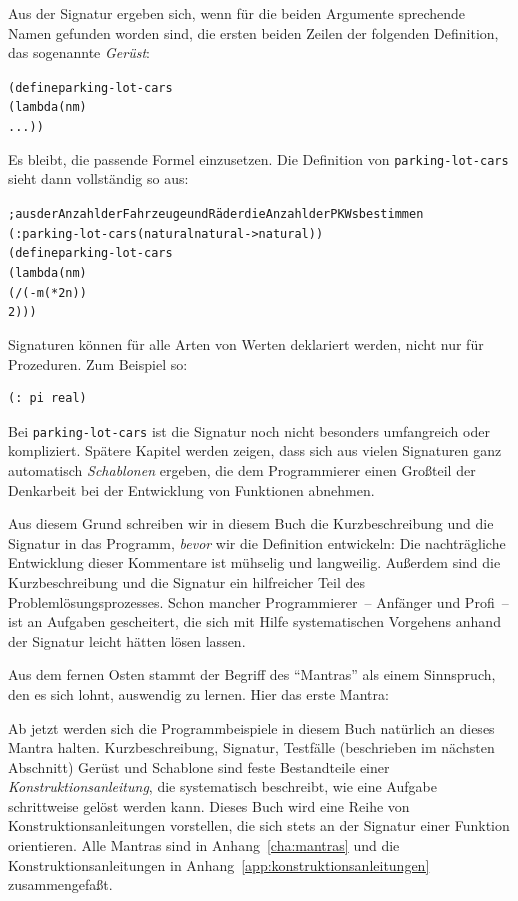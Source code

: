 Aus der Signatur ergeben sich, wenn für die beiden Argumente
sprechende Namen gefunden worden sind, die ersten beiden Zeilen der folgenden
Definition, das sogenannte \textit{Gerüst}:
%
\begin{alltt}
(define parking-lot-cars
  (lambda (n m)
    ...))
\end{alltt}
%
Es bleibt, die passende Formel einzusetzen.  Die Definition
von \texttt{parking-lot-cars} sieht dann vollständig so aus:
%
\begin{alltt}
; aus der Anzahl der Fahrzeuge und Räder die Anzahl der PKWs bestimmen
(: parking-lot-cars (natural natural -> natural))
(define parking-lot-cars
  (lambda (n m)
    (/ (- m (* 2 n))
       2)))
\end{alltt}
%
Signaturen können für alle Arten von Werten deklariert werden, nicht
nur für Prozeduren.  Zum Beispiel so:
%
\begin{verbatim}
(: pi real)
\end{verbatim}
%
Bei \texttt{parking-lot-cars} ist die Signatur noch nicht besonders
umfangreich oder kompliziert.
Spätere Kapitel werden zeigen, dass sich aus vielen Signaturen ganz
automatisch \textit{Schablonen} ergeben, die dem
Programmierer einen Großteil der Denkarbeit bei der Entwicklung von
Funktionen abnehmen.

Aus diesem Grund schreiben wir in diesem Buch die
Kurzbeschreibung und die Signatur in das Programm, \emph{bevor} wir
die Definition entwickeln: 
Die
nachträgliche Entwicklung dieser Kommentare ist mühselig und
langweilig.  Außerdem sind die Kurzbeschreibung und die
Signatur ein hilfreicher Teil des Problemlösungsprozesses.
Schon mancher Programmierer~-- Anfänger und Profi~--
ist an Aufgaben gescheitert, die sich mit Hilfe systematischen Vorgehens
anhand der Signatur leicht hätten lösen lassen.

Aus dem fernen Osten stammt der Begriff des "`Mantras"' als einem
Sinnspruch, den es sich lohnt, auswendig zu lernen.  Hier das erste Mantra:
%
\begin{mantra}\label{mantra:contract}

\end{mantra}
%
Ab jetzt werden sich die Programmbeispiele in diesem Buch natürlich
an dieses Mantra halten.  Kurzbeschreibung, Signatur, Testfälle
(beschrieben im nächsten Abschnitt) Gerüst und
Schablone sind feste Bestandteile einer
\textit{Konstruktionsanleitung}, die
systematisch beschreibt, wie eine Aufgabe schrittweise gelöst werden
kann.  Dieses Buch wird eine Reihe von Konstruktionsanleitungen
vorstellen, die sich stets an der Signatur einer Funktion orientieren.
Alle Mantras sind in Anhang~\ref{cha:mantras} und die
Konstruktionsanleitungen in Anhang~\ref{app:konstruktionsanleitungen}
zusammengefaßt.

